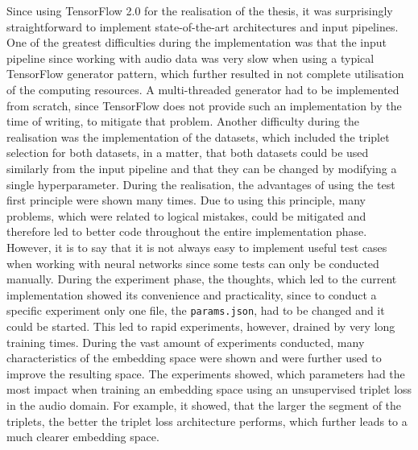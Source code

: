 Since using TensorFlow 2.0 for the realisation of the thesis, it was surprisingly straightforward to implement state-of-the-art architectures and input pipelines. One of the greatest difficulties during the implementation was that the input pipeline since working with audio data was very slow when using a typical TensorFlow generator pattern, which further resulted in not complete utilisation of the computing resources. A multi-threaded generator had to be implemented from scratch, since TensorFlow does not provide such an implementation by the time of writing, to mitigate that problem. Another difficulty during the realisation was the implementation of the datasets, which included the triplet selection for both datasets, in a matter, that both datasets could be used similarly from the input pipeline and that they can be changed by modifying a single hyperparameter. During the realisation, the advantages of using the test first principle were shown many times. Due to using this principle, many problems, which were related to logical mistakes, could be mitigated and therefore led to better code throughout the entire implementation phase. However, it is to say that it is not always easy to implement useful test cases when working with neural networks since some tests can only be conducted manually.
\newline
\newline
During the experiment phase, the thoughts, which led to the current implementation showed its convenience and practicality, since to conduct a specific experiment only one file, the \texttt{params.json}, had to be changed and it could be started. This led to rapid experiments, however, drained by very long training times. During the vast amount of experiments conducted, many characteristics of the embedding space were shown and were further used to improve the resulting space. The experiments showed, which parameters had the most impact when training an embedding space using an unsupervised triplet loss in the audio domain. For example, it showed, that the larger the segment of the triplets, the better the triplet loss architecture performs, which further leads to a much clearer embedding space.
\newline
\newline
